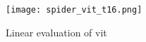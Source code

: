 \begin{figure}[H]
    \begin{center}
    \texttt{[image: spider\_vit\_t16.png]}
    \caption{Linear evaluation of \gls{vit}}\label{fig:spider_vit_t16}
    \end{center}
\end{figure}




